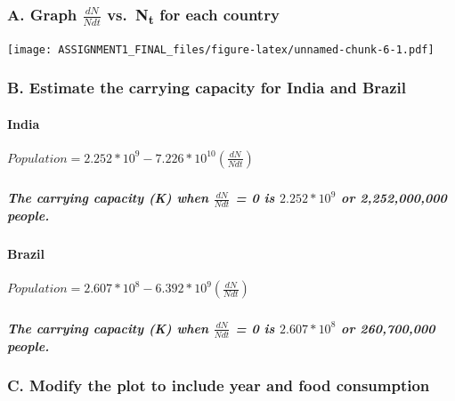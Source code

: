 \documentclass[]{article}
\let\oldparagraph\paragraph
\renewcommand{\paragraph}[1]{\oldparagraph{#1}\mbox{}}
\let\oldsubparagraph\subparagraph
\renewcommand{\subparagraph}[1]{\oldsubparagraph{#1}\mbox{}}
\begin{document}
\subsubsection{\texorpdfstring{A. Graph \(\frac{dN}{Ndt}\)
vs.~N\textsubscript{t} for each
country}{A. Graph \textbackslash{}frac\{dN\}\{Ndt\} vs.~Nt for each country}}\label{a.-graph-fracdnndt-vs.nt-for-each-country}

\texttt{[image: ASSIGNMENT1\_FINAL\_files/figure-latex/unnamed-chunk-6-1.pdf]}

\subsubsection{B. Estimate the carrying capacity for India and
Brazil}\label{b.-estimate-the-carrying-capacity-for-india-and-brazil}

\paragraph{India}\label{india}

\subparagraph{\texorpdfstring{\(Population = 2.252*10^9 - 7.226*10^{10}(\frac{dN}{Ndt})\)}{Population = 2.252*10\^{}9 - 7.226*10\^{}\{10\}(\textbackslash{}frac\{dN\}\{Ndt\})}}\label{population-2.252109---7.2261010fracdnndt}

\subparagraph{\texorpdfstring{The carrying capacity (K) when
\(\frac{dN}{Ndt}\) = 0 is \(2.252*10^9\) or 2,252,000,000
people.}{The carrying capacity (K) when \textbackslash{}frac\{dN\}\{Ndt\} = 0 is 2.252*10\^{}9 or 2,252,000,000 people.}}\label{the-carrying-capacity-k-when-fracdnndt-0-is-2.252109-or-2252000000-people.}

\paragraph{Brazil}\label{brazil}

\subparagraph{\texorpdfstring{\(Population = 2.607*10^8 - 6.392*10^9(\frac{dN}{Ndt})\)}{Population = 2.607*10\^{}8 - 6.392*10\^{}9(\textbackslash{}frac\{dN\}\{Ndt\})}}\label{population-2.607108---6.392109fracdnndt}

\subparagraph{\texorpdfstring{The carrying capacity (K) when
\(\frac{dN}{Ndt}\) = 0 is \(2.607*10^8\) or 260,700,000
people.}{The carrying capacity (K) when \textbackslash{}frac\{dN\}\{Ndt\} = 0 is 2.607*10\^{}8 or 260,700,000 people.}}\label{the-carrying-capacity-k-when-fracdnndt-0-is-2.607108-or-260700000-people.}

\subsubsection{C. Modify the plot to include year and food
consumption}\label{c.-modify-the-plot-to-include-year-and-food-consumption}
\end{document}

